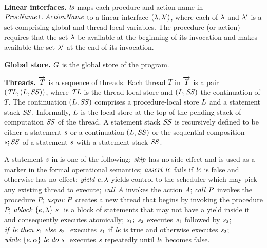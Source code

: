\noindent
{\bf Linear interfaces.}
$\mathit{ls}$ maps each procdure and action name in $\mathit{ProcName} \cup \mathit{ActionName}$ to a linear interface 
$(\lambda,\lambda')$, where each of $\lambda$ and $\lambda'$ is a set comprising global and thread-local variables.
The procedure (or action) requires that the set $\lambda$ be available at the beginning of its invocation 
and makes available the set $\lambda'$ at the end of its invocation.

\noindent
{\bf Global store.}
$G$ is the global store of the program.

\noindent
{\bf Threads.}
$\overrightarrow{\mathit{T}}$ is a sequence of threads.
Each thread $T$ in $\overrightarrow{\mathit{T}}$ is a pair $(\mathit{TL}, (L, \mathit{SS}))$, where $\mathit{TL}$ is the thread-local 
store and $(L, \mathit{SS})$ the continuation of $T$.  
The continuation $(L, \mathit{SS})$ comprises a procedure-local store $L$ and a statement stack $\mathit{SS}$.
Informally, $L$ is the local store at the top of the pending stack of computation $\mathit{SS}$ of the thread.
A statement stack $\mathit{SS}$ is recursively defined to be either a statement $\mathit{s}$ 
or a continuation $(L,\mathit{SS})$ or the sequential composition $\mathit{s};\mathit{SS}$ of a statement $\mathit{s}$ with 
a statement stack $\mathit{SS}$.

A statement $\mathit{s}$ in \civl is one of the following: 
$\mathit{skip}$ has no side effect and is used as a marker in the formal operational semantics;
$\mathit{assert}\ \mathit{le}$ fails if $\mathit{le}$ is false and otherwise has no effect;
$\mathit{yield}\ e,\lambda$ yields control to the scheduler which may pick any existing thread to execute;
$\mathit{call}\ A$ invokes the action $A$;
$\mathit{call}\ P$ invokes the procedure $P$;
$\mathit{async}\ P$ creates a new thread that begins by invoking the procedure $P$;
$\mathit{ablock}\ {\{e,\lambda\}}\ {\mathit{s}}\ $ is a block of statements that may not have a yield inside it and consequently executes atomically;
$\mathit{s}_1;\;\mathit{s}_2$ executes $\mathit{s}_1$ followed by $\mathit{s}_2$;
${\mathit{if}\ {\mathit{le}}\ }{\mathit{then}\ {\mathit{s}_1}\ }{\mathit{else}\ {\mathit{s}_2}\ }$ executes $\mathit{s}_1$ if $\mathit{le}$ is true and otherwise executes $\mathit{s}_2$;
$\mathit{while}\ \{{e,\alpha}\}\ {{\mathit{le}}\ } \mathit{do}\ {{\mathit{s}}\ }$ executes $\mathit{s}$ repeatedly until $\mathit{le}$ becomes false.

